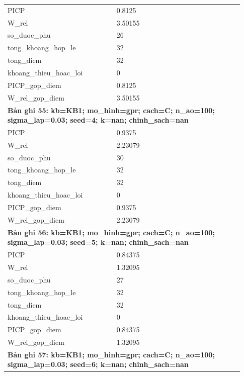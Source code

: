 \begin{longtable}{p{0.43\linewidth}p{0.50\linewidth}}
PICP & 0.8125 \\
W\_\allowbreak rel & 3.50155 \\
so\_\allowbreak duoc\_\allowbreak phu & 26 \\
tong\_\allowbreak khoang\_\allowbreak hop\_\allowbreak le & 32 \\
tong\_\allowbreak diem & 32 \\
khoang\_\allowbreak thieu\_\allowbreak hoac\_\allowbreak loi & 0 \\
PICP\_\allowbreak gop\_\allowbreak diem & 0.8125 \\
W\_\allowbreak rel\_\allowbreak gop\_\allowbreak diem & 3.50155 \\
\midrule
\multicolumn{2}{p{0.95\linewidth}}{\textbf{Bản ghi 55: kb=KB1; mo\_hinh=gpr; cach=C; n\_ao=100; sigma\_lap=0.03; seed=4; k=nan; chinh\_sach=nan}} \\
PICP & 0.9375 \\
W\_\allowbreak rel & 2.23079 \\
so\_\allowbreak duoc\_\allowbreak phu & 30 \\
tong\_\allowbreak khoang\_\allowbreak hop\_\allowbreak le & 32 \\
tong\_\allowbreak diem & 32 \\
khoang\_\allowbreak thieu\_\allowbreak hoac\_\allowbreak loi & 0 \\
PICP\_\allowbreak gop\_\allowbreak diem & 0.9375 \\
W\_\allowbreak rel\_\allowbreak gop\_\allowbreak diem & 2.23079 \\
\midrule
\multicolumn{2}{p{0.95\linewidth}}{\textbf{Bản ghi 56: kb=KB1; mo\_hinh=gpr; cach=C; n\_ao=100; sigma\_lap=0.03; seed=5; k=nan; chinh\_sach=nan}} \\
PICP & 0.84375 \\
W\_\allowbreak rel & 1.32095 \\
so\_\allowbreak duoc\_\allowbreak phu & 27 \\
tong\_\allowbreak khoang\_\allowbreak hop\_\allowbreak le & 32 \\
tong\_\allowbreak diem & 32 \\
khoang\_\allowbreak thieu\_\allowbreak hoac\_\allowbreak loi & 0 \\
PICP\_\allowbreak gop\_\allowbreak diem & 0.84375 \\
W\_\allowbreak rel\_\allowbreak gop\_\allowbreak diem & 1.32095 \\
\midrule
\multicolumn{2}{p{0.95\linewidth}}{\textbf{Bản ghi 57: kb=KB1; mo\_hinh=gpr; cach=C; n\_ao=100; sigma\_lap=0.03; seed=6; k=nan; chinh\_sach=nan}} \\

\end{longtable}
